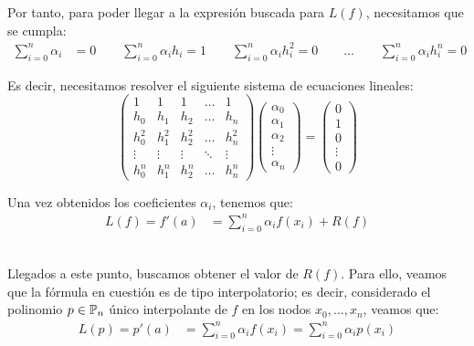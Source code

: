 \begin{ejercicio}
    Por tanto, para poder llegar a la expresión buscada para $L(f)$, necesitamos que se cumpla:
    \begin{align*}
        \sum_{i=0}^n \alpha_i &= 0\qquad 
        \sum_{i=0}^n \alpha_i h_i = 1\qquad
        \sum_{i=0}^n \alpha_i h_i^2 = 0\qquad
        \dots\qquad
        \sum_{i=0}^n \alpha_i h_i^n = 0
    \end{align*}

    Es decir, necesitamos resolver el siguiente sistema de ecuaciones lineales:
    \begin{equation}\label{eq:1}
        \begin{pmatrix}
            1 & 1 & 1 & \dots & 1\\
            h_0 & h_1 & h_2 & \dots & h_n\\
            h_0^2 & h_1^2 & h_2^2 & \dots & h_n^2\\
            \vdots & \vdots & \vdots & \ddots & \vdots\\
            h_0^n & h_1^n & h_2^n & \dots & h_n^n
        \end{pmatrix}
        \begin{pmatrix}
            \alpha_0\\
            \alpha_1\\
            \alpha_2\\
            \vdots\\
            \alpha_n
        \end{pmatrix}
        =
        \begin{pmatrix}
            0\\
            1\\
            0\\
            \vdots\\
            0
        \end{pmatrix}
    \end{equation}

    Una vez obtenidos los coeficientes $\alpha_i$, tenemos que:
    \begin{align*}
        L(f) = f'(a) &= \sum_{i=0}^n \alpha_i f(x_i) + R(f)
    \end{align*}~\vspace{2cm}

    Llegados a este punto, buscamos obtener el valor de $R(f)$. Para ello, veamos que la fórmula en cuestión es de tipo interpolatorio; es decir, considerado el polinomio $p\in \mathbb{P}_n$ único interpolante de $f$ en los nodos $x_0,\dots,x_n$, veamos que:
    \begin{align*}
        L(p) = p'(a) &= \sum_{i=0}^n \alpha_i f(x_i) = \sum_{i=0}^n \alpha_i p(x_i)
    \end{align*}


\end{ejercicio}
